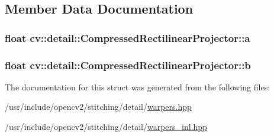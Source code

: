 \subsection{Member Data Documentation}
\hypertarget{structcv_1_1detail_1_1CompressedRectilinearProjector_a13adc4baeb85a15e42b374d5a1662e1b}{
\subsubsection[{a}]{\setlength{\rightskip}{0pt plus 5cm}float cv\-::detail\-::\-Compressed\-Rectilinear\-Projector\-::a}}\label{structcv_1_1detail_1_1CompressedRectilinearProjector_a13adc4baeb85a15e42b374d5a1662e1b}
\hypertarget{structcv_1_1detail_1_1CompressedRectilinearProjector_a401bab51b49ffec7698dbf8dca4b2c77}{
\subsubsection[{b}]{\setlength{\rightskip}{0pt plus 5cm}float cv\-::detail\-::\-Compressed\-Rectilinear\-Projector\-::b}}\label{structcv_1_1detail_1_1CompressedRectilinearProjector_a401bab51b49ffec7698dbf8dca4b2c77}


The documentation for this struct was generated from the following files\-:\begin{DoxyCompactItemize}
\item 
/usr/include/opencv2/stitching/detail/\hyperlink{detail_2warpers_8hpp}{warpers.\-hpp}\item 
/usr/include/opencv2/stitching/detail/\hyperlink{warpers__inl_8hpp}{warpers\-\_\-inl.\-hpp}\end{DoxyCompactItemize}
